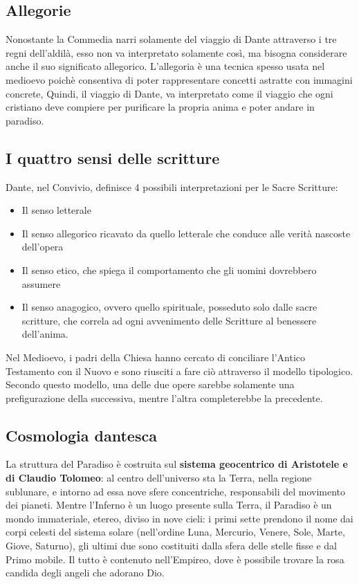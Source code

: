 \documentclass[10pt,a4paper]{article}
\begin{document}
	 \subsection{Allegorie}
	 
	 Nonostante la Commedia narri solamente del viaggio di Dante attraverso i tre regni dell'aldilà, esso non va interpretato solamente così, ma bisogna considerare anche il suo significato allegorico. L'allegoria è una tecnica spesso usata nel medioevo poichè consentiva di poter rappresentare concetti astratte con immagini concrete, Quindi, il viaggio di Dante, va interpretato come il viaggio che ogni cristiano deve compiere per purificare la propria anima e poter andare in paradiso.
	 
	 \subsection{I quattro sensi delle scritture}
	 
	 Dante, nel Convivio, definisce 4 possibili interpretazioni per le Sacre Scritture:
	 \begin{itemize}
	 	\item Il senso letterale
	 	\item Il senso allegorico ricavato da quello letterale che conduce alle verità nascoste dell'opera
	 	\item Il senso etico, che spiega il comportamento che gli uomini dovrebbero assumere
	 	\item Il senso anagogico, ovvero quello spirituale, posseduto solo dalle sacre scritture, che correla ad ogni avvenimento delle Scritture al benessere dell'anima. 
	 \end{itemize}
 
 	Nel Medioevo, i padri della Chiesa hanno cercato di conciliare l'Antico Testamento con il Nuovo e sono riusciti a fare ciò attraverso il modello tipologico. Secondo questo modello, una delle due opere sarebbe solamente una prefigurazione della successiva, mentre l'altra completerebbe la precedente. 
 	
 	
 	
 	\subsection{Cosmologia dantesca}
 	
 	La struttura del Paradiso è costruita sul \textbf{sistema geocentrico di Aristotele e di Claudio Tolomeo}: al centro dell'universo sta la Terra, nella regione sublunare, e intorno ad essa nove sfere concentriche, responsabili del movimento dei pianeti. Mentre l'Inferno è un luogo presente sulla Terra, il Paradiso è un mondo immateriale, etereo, diviso in nove cieli: i primi sette prendono il nome dai corpi celesti del sistema solare (nell'ordine Luna, Mercurio, Venere, Sole, Marte, Giove, Saturno), gli ultimi due sono costituiti dalla sfera delle stelle fisse e dal Primo mobile. Il tutto è contenuto nell'Empireo, dove è possibile trovare la rosa candida degli angeli che adorano Dio.
 	
\end{document}
